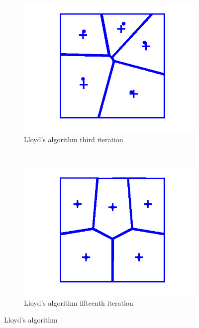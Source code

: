 \documentclass[11pt,a4paper,twocolumn]{article}
\begin{document}
\begin{figure}[h!]
\begin{subfigure}[b]{0.2\textwidth}
	\includegraphics[width=\textwidth]{images/LloydsMethodIteration3.png}
	\caption{Lloyd's algorithm third iteration}
	\label{fig:lloyd3}
\end{subfigure}
~
\begin{subfigure}[b]{0.2\textwidth}
	\centering
		\includegraphics[width=\textwidth]{images/LloydsMethodIteration15.png}
		\caption{Lloyd's algorithm fifteenth iteration}
	\label{fig:lloyd15}
\end{subfigure}
\caption{Lloyd's algorithm \cite{lloydwiki}} \label{fig:lloydal}
\end{figure}
\end{document}
